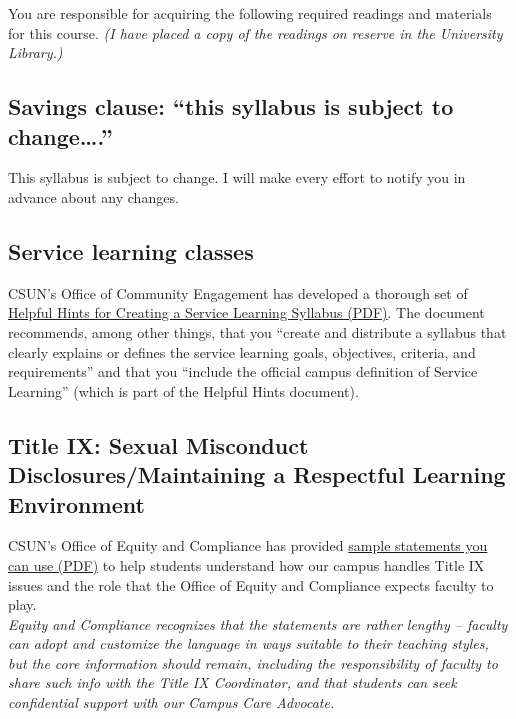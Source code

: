 \documentclass[
  letterpaper,
  DIV=11,
  numbers=noendperiod]{scrartcl}
\begin{document}
You are responsible for acquiring the following required readings and
materials for this course. \emph{(I have placed a copy of the readings
on reserve in the University Library.)}

\subsection{Savings clause: ``this syllabus is subject to
change\ldots.''}\label{savings-clause-this-syllabus-is-subject-to-change.}

This syllabus is subject to change. I will make every effort to notify
you in advance about any changes.

\subsection{Service learning classes}\label{service-learning-classes}

CSUN's Office of Community Engagement has developed a thorough set of
\href{http://live-csu-northridge.pantheonsite.io}{Helpful Hints for
Creating a Service Learning Syllabus (PDF)}. The document recommends,
among other things, that you ``create and distribute a syllabus that
clearly explains or defines the service learning goals, objectives,
criteria, and requirements'' and that you ``include the official campus
definition of Service Learning'' (which is part of the Helpful Hints
document).

\subsection{Title IX: Sexual Misconduct Disclosures/Maintaining a
Respectful Learning
Environment}\label{title-ix-sexual-misconduct-disclosuresmaintaining-a-respectful-learning-environment}

CSUN's Office of Equity and Compliance has provided
\href{http://live-csu-northridge.pantheonsite.io}{sample statements you
can use (PDF)} to help students understand how our campus handles Title
IX issues and the role that the Office of Equity and Compliance expects
faculty to play.\\
\emph{Equity and Compliance recognizes that the statements are rather
lengthy -- faculty can adopt and customize the language in ways suitable
to their teaching styles, but the core information should remain,
including the responsibility of faculty to share such info with the
Title IX Coordinator, and that students can seek confidential support
with our Campus Care Advocate.}
\end{document}
